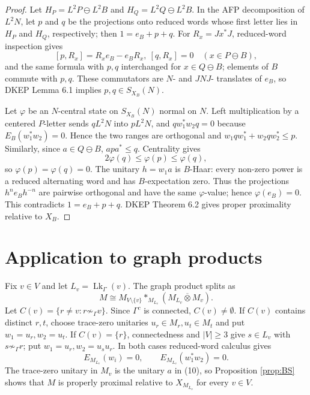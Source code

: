 \documentclass[12pt]{article}
\DeclareMathOperator{\Lk}{Lk}
\newcommand{\bbarotimes}{\mathbin{\overline{\otimes}}}
\begin{document}
\begin{proof}
Let \(H_P=L^2P\ominus L^2B\) and \(H_Q=L^2Q\ominus L^2B\).  In the AFP
decomposition of \(L^2N\), let \(p\) and \(q\) be the projections onto reduced
words whose first letter lies in \(H_P\) and \(H_Q\), respectively; then
\(1=e_B+p+q\).  For \(R_x=Jx^*J\), reduced-word inspection gives
\[
[p,R_x]=R_xe_B-e_BR_x,\ [q,R_x]=0\quad(x\in P\ominus B),
\]
and the same formula with \(p,q\) interchanged for \(x\in Q\ominus B\); elements
of \(B\) commute with \(p,q\).  These commutators are \(N\)- and \(JNJ\)-
translates of \(e_B\), so DKEP Lemma 6.1 implies \(p,q\in S_{X_B}(N)\).

Let \(\varphi\) be an \(N\)-central state on \(S_{X_B}(N)\) normal on \(N\).
Left multiplication by a centered \(P\)-letter sends \(qL^2N\) into \(pL^2N\),
and \(q w_1^*w_2q=0\) because \(E_B(w_1^*w_2)=0\).  Hence the two ranges are
orthogonal and
\(w_1qw_1^*+w_2qw_2^*\le p\).  Similarly, since \(a\in Q\ominus B\),
\(apa^*\le q\).  Centrality gives
\[
        2\varphi(q)\le\varphi(p)\le\varphi(q),
\]
so \(\varphi(p)=\varphi(q)=0\).  The unitary \(h=w_1a\) is \(B\)-Haar: every
non-zero power is a reduced alternating word and has \(B\)-expectation zero.
Thus the projections \(h^ne_Bh^{-n}\) are pairwise orthogonal and have the same
\(\varphi\)-value; hence \(\varphi(e_B)=0\).  This contradicts
\(1=e_B+p+q\).  DKEP Theorem 6.2 gives proper proximality relative to \(X_B\).
\end{proof}

\section*{Application to graph products}

Fix \(v\in V\) and let \(L_v=\Lk_\Gamma(v)\).  The graph product splits as
\[
        M\cong M_{V\setminus\{v\}}*_{M_{L_v}}
        (M_{L_v}\bbarotimes M_v).                                \tag{10}
\]
Let \(C(v)=\{r\ne v:r\not\sim_\Gamma v\}\).  Since \(\Gamma^c\) is connected,
\(C(v)\ne\emptyset\).  If \(C(v)\) contains distinct \(r,t\), choose trace-zero
unitaries \(u_r\in M_r,u_t\in M_t\) and put \(w_1=u_r,w_2=u_t\).  If
\(C(v)=\{r\}\), connectedness and \(|V|\ge3\) give
\(s\in L_v\) with \(s\not\sim_\Gamma r\); put \(w_1=u_r,w_2=u_su_r\).  In both
cases reduced-word calculus gives
\[
        E_{M_{L_v}}(w_i)=0,\qquad E_{M_{L_v}}(w_1^*w_2)=0 .
\]
The trace-zero unitary in \(M_v\) is the unitary \(a\) in (10), so
Proposition \ref{prop:BS} shows that \(M\) is properly proximal relative to
\(X_{M_{L_v}}\) for every \(v\in V\).
\end{document}
